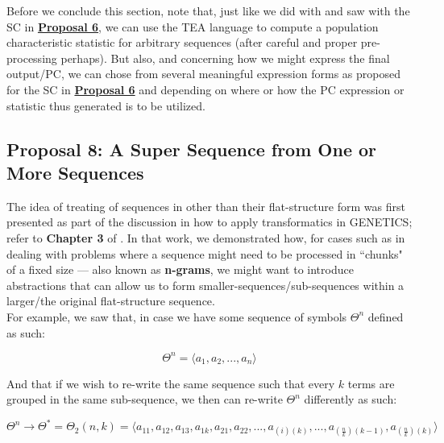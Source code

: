 \documentclass[a4paper, 18pt]{book} %
\begin{document}
Before we conclude this section, note that, just like we did with and saw with the SC in \textbf{\hyperref[PROP6]{Proposal 6}}, we can use the TEA language to compute a population characteristic statistic for arbitrary sequences (after careful and proper pre-processing perhaps). But also, and concerning how we might express the final output/PC, we can chose from several meaningful expression forms as proposed for the SC in \textbf{\hyperref[PROP6]{Proposal 6}} and depending on where or how the PC expression or statistic thus generated is to be utilized.

\subsection{Proposal 8: A Super Sequence from One or More Sequences\cite{lutalo_2025_trans_genetics}}
\label{PROP8}

The idea of treating of sequences in other than their flat-structure form was first presented as part of the discussion in how to apply transformatics in GENETICS\cite{lutalo_2025_trans_genetics}; refer to \textbf{Chapter 3} of \cite{lutalo_2025_trans_genetics}. In that work, we demonstrated how, for cases such as in dealing with problems where a sequence might need to be processed in ``chunks" of a fixed size --- also known as \textbf{n-grams}, we might want to introduce abstractions that can allow us to form smaller-sequences/sub-sequences within a larger/the original flat-structure sequence.\\

For example, we saw that, in case we have some sequence of symbols $\Theta^n$ defined as such:

\vspace{1em}
\begin{equation}
\label{EQSEQ1b}
\Theta^n = \langle a_1, a_2,...,a_n\rangle
\end{equation}
\vspace{1em}

And that if we wish to re-write the same sequence such that every $k$ terms are grouped in the same sub-sequence, we then can re-write $\Theta^n$ differently as such:

\vspace{1em}
\begin{equation}
\label{EQSEQ2b}
\Theta^n \rightarrow \Theta^* = \Theta_2(n,k) = \langle a_{11}, a_{12}, a_{13}, a_{1k}, a_{21}, a_{22},...,a_{(i)(k)},...,a_{(\frac{n}{k})(k-1)},a_{(\frac{n}{k})(k)}\rangle
\end{equation}
\vspace{1em}
\end{document}
